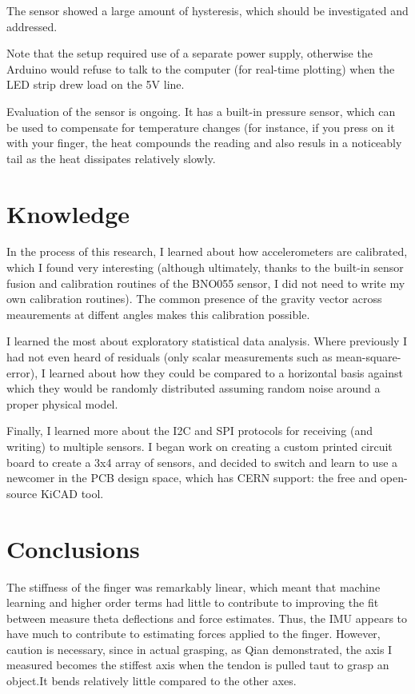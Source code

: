 \documentclass[preprint,12pt,3p]{elsarticle}
\begin{document}
The sensor showed a large amount of hysteresis, which should be investigated and addressed.

Note that the setup required use of a separate power supply, otherwise the Arduino would refuse to talk to the
computer (for real-time plotting) when the LED strip drew load on the 5V line.

Evaluation of the sensor is ongoing. It has a built-in pressure sensor, which
can be used to compensate for temperature changes (for instance, if you press on
it with your finger, the heat compounds the reading and also resuls in a
noticeably tail as the heat dissipates relatively slowly.

\section{Knowledge}

In the process of this research, I learned about how accelerometers are calibrated, which I found
very interesting (although ultimately, thanks to the built-in sensor fusion and calibration routines of the BNO055
sensor, I did not need to write my own calibration routines). The common presence of the gravity
vector across meaurements at diffent angles makes this calibration possible.

I learned the most about exploratory statistical data analysis. Where previously I had not even
heard of residuals (only scalar measurements such as mean-square-error), I learned about how they
could be compared to a horizontal basis against which they would be randomly distributed assuming
random noise around a proper physical model.

Finally, I learned more about the I2C and SPI protocols for receiving (and writing) to multiple
sensors. I began work on creating a custom printed circuit board to create a 3x4 array of sensors,
and decided to switch and learn to use a newcomer in the PCB design space, which has CERN support: the free and open-source
KiCAD tool.

\section{Conclusions}

The stiffness of the finger was remarkably linear, which meant that machine learning and higher
order terms had little to contribute to improving the fit between measure theta deflections and
force estimates. Thus, the IMU appears to have much to contribute to estimating forces applied to
the finger. However, caution is necessary, since in actual grasping, as Qian demonstrated, the
axis I measured becomes the stiffest axis when the tendon is pulled taut to grasp an object.It bends
relatively little compared to the other axes.
\end{document}

